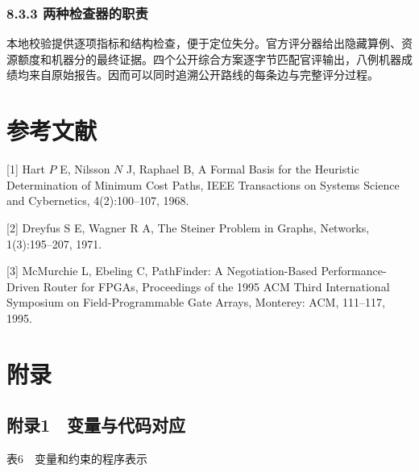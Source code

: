 \documentclass[12pt,a4paper]{article}
\begin{document}
\subsubsection{8.3.3
两种检查器的职责}\label{ux4e24ux79cdux68c0ux67e5ux5668ux7684ux804cux8d23}

本地校验提供逐项指标和结构检查，便于定位失分。官方评分器给出隐藏算例、资源额度和机器分的最终证据。四个公开综合方案逐字节匹配官评输出，八例机器成绩均来自原始报告。因而可以同时追溯公开路线的每条边与完整评分过程。

\clearpage\section{参考文献}\label{ux53c2ux8003ux6587ux732e}

{[}1{]} Hart \(P\) E, Nilsson \(N\) J, Raphael B, A Formal Basis for the
Heuristic Determination of Minimum Cost Paths, IEEE Transactions on
Systems Science and Cybernetics, 4(2):100--107, 1968.

{[}2{]} Dreyfus S E, Wagner R A, The Steiner Problem in Graphs,
Networks, 1(3):195--207, 1971.

{[}3{]} McMurchie L, Ebeling C, PathFinder: A Negotiation-Based
Performance-Driven Router for FPGAs, Proceedings of the 1995 ACM Third
International Symposium on Field-Programmable Gate Arrays, Monterey:
ACM, 111--117, 1995.

\clearpage\section{附录}\label{ux9644ux5f55}

\subsection{附录1　变量与代码对应}\label{ux9644ux5f551-ux53d8ux91cfux4e0eux4ee3ux7801ux5bf9ux5e94}

\begin{center}\fontsize{12}{14.4}\selectfont 表6　变量和约束的程序表示\end{center}
\end{document}
